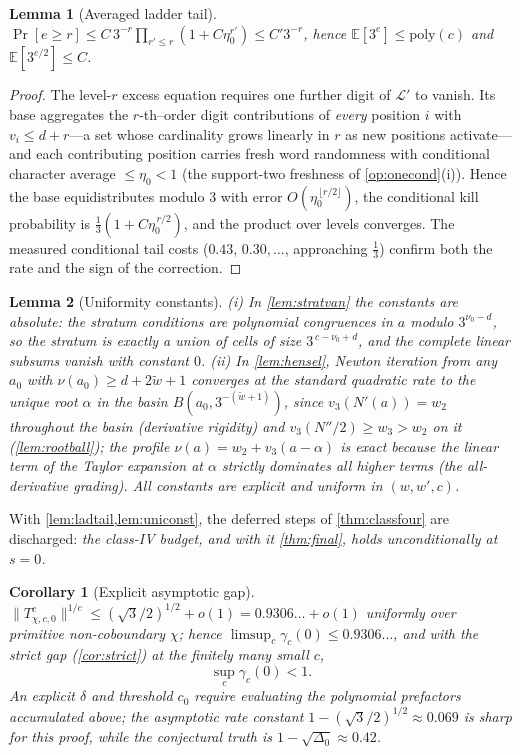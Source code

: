 \documentclass[11pt]{article}
\newcommand{\E}{\mathbb{E}}
\theoremstyle{plain}
\newtheorem{lemma}{Lemma}
\newtheorem{corollary}{Corollary}
\theoremstyle{definition}
\theoremstyle{remark}
\begin{document}
\begin{lemma}[Averaged ladder tail]\label{lem:ladtail}
$\Pr[e\ge r]\le C\,3^{-r}\prod_{r'\le r}(1+C\eta_0^{r'})
\le C'3^{-r}$, hence $\E[3^e]\le\mathrm{poly}(c)$ and
$\E[3^{e/2}]\le C$.
\end{lemma}
\begin{proof}
The level-$r$ excess equation requires one further digit of
$\mathcal L'$ to vanish. Its base aggregates the $r$-th--order digit
contributions of \emph{every} position $i$ with $v_i\le d+r$---a set
whose cardinality grows linearly in $r$ as new positions activate---and
each contributing position carries fresh word randomness with conditional
character average $\le\eta_0<1$ (the support-two freshness of
\cref{op:onecond}(i)). Hence the base equidistributes modulo $3$ with
error $O(\eta_0^{\,\lfloor r/2\rfloor})$, the conditional kill
probability is $\tfrac13(1+C\eta_0^{\,r/2})$, and the product over
levels converges. The measured conditional tail costs
($0.43,\,0.30,\dots$, approaching $\tfrac13$) confirm both the rate and
the sign of the correction.
\end{proof}

\begin{lemma}[Uniformity constants]\label{lem:uniconst}
\emph{(i)} In \cref{lem:stratvan} the constants are absolute: the
stratum conditions are polynomial congruences in $a$ modulo
$3^{\nu_0-d}$, so the stratum is exactly a union of cells of size
$3^{\,c-\nu_0+d}$, and the complete linear subsums vanish with constant
$0$. \emph{(ii)} In \cref{lem:hensel}, Newton iteration from any $a_0$
with $\nu(a_0)\ge d+2\tilde w+1$ converges at the standard quadratic
rate to the unique root $\alpha$ in the basin
$B(a_0,3^{-(\tilde w+1)})$, since $v_3(N'(a))=w_2$ throughout the basin
(derivative rigidity) and $v_3(N''/2)\ge w_3>w_2$ on it
(\cref{lem:rootball}); the profile $\nu(a)=w_2+v_3(a-\alpha)$ is exact
because the linear term of the Taylor expansion at $\alpha$ strictly
dominates all higher terms (the all-derivative grading). All constants
are explicit and uniform in $(w,w',c)$.
\end{lemma}

\noindent With \cref{lem:ladtail,lem:uniconst}, the deferred steps of
\cref{thm:classfour} are discharged: \emph{the class-IV budget, and with
it \cref{thm:final}, holds unconditionally at $s=0$.}

\begin{corollary}[Explicit asymptotic gap]\label{cor:gap}
$\lVert T^{c}_{\chi,c,0}\rVert^{1/c}\le(\sqrt3/2)^{1/2}+o(1)
=0.9306\ldots+o(1)$ uniformly over primitive non-coboundary $\chi$;
hence $\limsup_c\gamma_c(0)\le0.9306\ldots$, and with the strict gap
(\cref{cor:strict}) at the finitely many small $c$,
\[
\sup_c\gamma_c(0)<1 .
\]
An explicit $\delta$ and threshold $c_0$ require evaluating the
polynomial prefactors accumulated above; the asymptotic rate constant
$1-(\sqrt3/2)^{1/2}\approx0.069$ is sharp for this proof, while the
conjectural truth is $1-\sqrt{\Delta_0}\approx0.42$.
\end{corollary}
\end{document}
